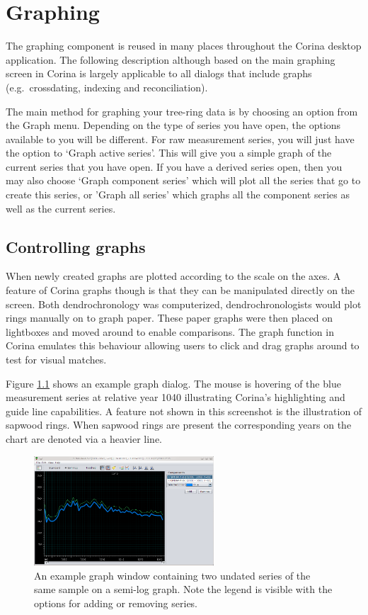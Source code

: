 \chapter{Graphing}

The graphing component is reused in many places throughout the Corina desktop application.  The following description although based on the main graphing screen in Corina is largely applicable to all dialogs that include graphs (e.g.\ crossdating, indexing and reconciliation).  

The main method for graphing your tree-ring data is by choosing an option from the Graph menu.  Depending on the type of series you have open, the options available to you will be different.  For raw measurement series, you will just have the option to `Graph active series'.  This will give you a simple graph of the current series that you have open.  If you have a derived series open, then you may also choose `Graph component series' which will plot all the series that go to create this series, or 'Graph all series' which graphs all the component series as well as the current series.

\section{Controlling graphs}

When newly created graphs are plotted according to the scale on the axes.  A feature of Corina graphs though is that they can be manipulated directly on the screen.  Both dendrochronology was computerized, dendrochronologists would plot rings manually on to graph paper.  These paper graphs were then placed on lightboxes and moved around to enable comparisons.  The graph function in Corina emulates this behaviour allowing users to click and drag graphs around to test for visual matches.

Figure \ref{fig:graph} shows an example graph dialog.  The mouse is hovering of the blue measurement series at relative year 1040 illustrating Corina's highlighting and guide line capabilities.  A feature not shown in this screenshot is the illustration of sapwood rings.  When sapwood rings are present the corresponding years on the chart are denoted via a heavier line.

\begin{figure}[hbtp]
  \centering
    \includegraphics[width=0.6\textwidth]{Images/graph.png}
    \caption{An example graph window containing two undated series of the same sample on a semi-log graph.  Note the legend is visible with the options for adding or removing series.}
    \label{fig:graph}
\end{figure}


